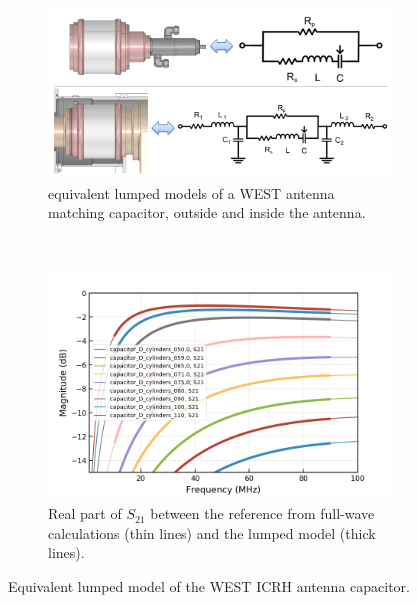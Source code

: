 \documentclass[%
aip,
cp,  %
amsmath,amssymb,%
reprint,%
]{revtex4-2}
\begin{document}
	\begin{figure}[t!]
		\centering
		\begin{subfigure}[t]{0.49\textwidth}
			\centering
			\includegraphics[width=.95\textwidth]{figures/capacitor_equivalent_circuit}
			\caption{equivalent lumped models of a WEST antenna matching capacitor, outside and inside the antenna.}
		\end{subfigure}%
		~
		\begin{subfigure}[t]{0.49\textwidth}
			\centering
			\includegraphics[width=\linewidth]{figures/comparison_fullwave_lumped_S21}
			\caption{Real part of $S_{21}$ between the reference from full-wave  calculations (thin lines) and the lumped model (thick lines).}
		\end{subfigure}
		\caption{Equivalent lumped model of the WEST ICRH antenna capacitor.}
		\label{fig:fig2}
	\end{figure}
	
	
\end{document}
